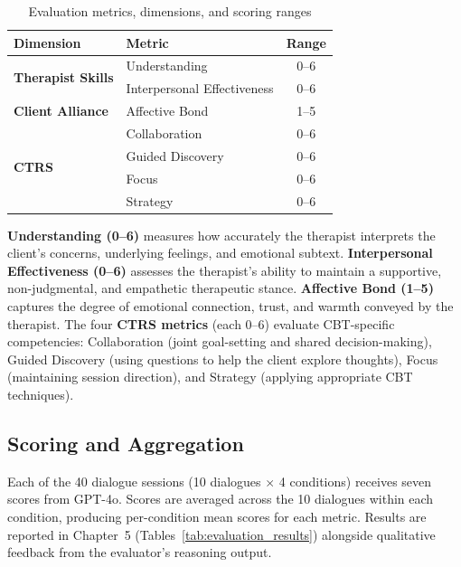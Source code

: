 \begin{table}[hbt!]
\centering
\caption{Evaluation metrics, dimensions, and scoring ranges}
\begin{tabular}{llc}
\hline
\textbf{Dimension} & \textbf{Metric} & \textbf{Range} \\ \hline
\multirow{2}{*}{\textbf{Therapist Skills}} & Understanding & 0--6 \\
                                           & Interpersonal Effectiveness & 0--6 \\ \hline
\textbf{Client Alliance} & Affective Bond & 1--5 \\ \hline
\multirow{4}{*}{\textbf{CTRS}} & Collaboration & 0--6 \\
                                & Guided Discovery & 0--6 \\
                                & Focus & 0--6 \\
                                & Strategy & 0--6 \\ \hline
\end{tabular}
\label{tab:evaluation-metrics}
\end{table}

\textbf{Understanding (0--6)} measures how accurately the therapist interprets the client's concerns, underlying feelings, and emotional subtext. \textbf{Interpersonal Effectiveness (0--6)} assesses the therapist's ability to maintain a supportive, non-judgmental, and empathetic therapeutic stance. \textbf{Affective Bond (1--5)} captures the degree of emotional connection, trust, and warmth conveyed by the therapist. The four \textbf{CTRS metrics} (each 0--6) evaluate CBT-specific competencies: Collaboration (joint goal-setting and shared decision-making), Guided Discovery (using questions to help the client explore thoughts), Focus (maintaining session direction), and Strategy (applying appropriate CBT techniques).

\subsection{Scoring and Aggregation}

Each of the 40 dialogue sessions (10 dialogues $\times$ 4 conditions) receives seven scores from GPT-4o. Scores are averaged across the 10 dialogues within each condition, producing per-condition mean scores for each metric. Results are reported in Chapter~5 (Tables~\ref{tab:evaluation_results}) alongside qualitative feedback from the evaluator's reasoning output.


